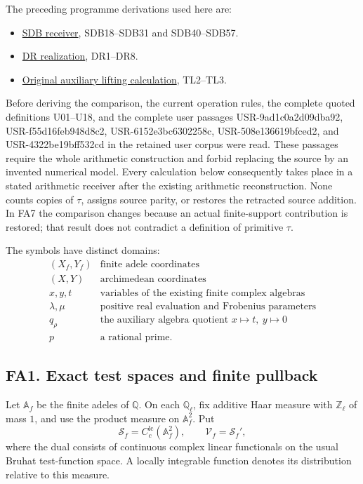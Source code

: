 The preceding programme derivations used here are:

\begin{itemize}
\tightlist
\item
  \href{../independent/CC_SUPPORTED_DOLBEAULT_BOUNDARY.tex}{SDB
  receiver}, SDB18--SDB31 and SDB40--SDB57.
\item
  \href{DISTRIBUTION_REALIZATION_OF_B_INDEPENDENT.md}{DR realization},
  DR1--DR8.
\item
  \href{TAU_LIFTING_AND_WEIGHT_SEPARATION.md}{Original auxiliary lifting
  calculation}, TL2--TL3.
\end{itemize}

Before deriving the comparison, the current
{operation rules}, the complete
quoted definitions U01--U18, and the complete user passages
USR-9ad1c0a2d09dba92, USR-f55d16feb948d8c2, USR-6152e3bc6302258c,
USR-508e136619bfced2, and USR-4322be19bff532cd in the retained user
corpus were read. These passages require the whole arithmetic
construction and forbid replacing the source by an invented numerical
model. Every calculation below consequently takes place in a stated
arithmetic receiver after the existing arithmetic reconstruction. None
counts copies of \(\tau\), assigns source parity, or restores the
retracted source addition. In FA7 the comparison changes because an
actual finite-support contribution is restored; that result does not
contradict a definition of primitive \(\tau\).

The symbols have distinct domains: \[
 \begin{array}{c|l}
 (X_f,Y_f)&\text{finite adele coordinates}\\
 (X,Y)&\text{archimedean coordinates}\\
 x,y,t&\text{variables of the existing finite complex algebras}\\
 \lambda,\mu&\text{positive real evaluation and Frobenius parameters}\\
 q_\rho&\text{the auxiliary algebra quotient }x\mapsto t,\ y\mapsto0\\
 p&\text{a rational prime}.
 \end{array}
\]

\subsection{FA1. Exact test spaces and finite
pullback}\label{fa1.-exact-test-spaces-and-finite-pullback}

Let \(\mathbb A_f\) be the finite adeles of \(\mathbb Q\). On each
\(\mathbb Q_\ell\), fix additive Haar measure with \(\mathbb Z_\ell\) of
mass \(1\), and use the product measure on \(\mathbb A_f^2\). Put \[
 \mathscr S_f=C_c^{\mathrm{lc}}(\mathbb A_f^2),\qquad
 \mathscr V_f=\mathscr S_f',
\tag{FA1.1}
\] where the dual consists of continuous complex linear functionals on
the usual Bruhat test-function space. A locally integrable function
denotes its distribution relative to this measure.

